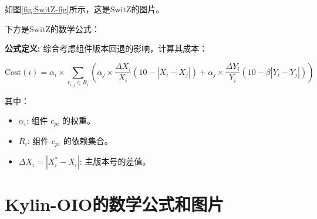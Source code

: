 \documentclass{article}
\begin{document}
如图\ref{fig:SwitZ-fig}所示，这是SwitZ的图片。

下方是SwitZ的数学公式：

\textbf{公式定义:} 综合考虑组件版本回退的影响，计算其成本：

$$
    \text{Cost}(i) = \alpha_i \times \sum_{r_{i,j} \in R_i} \left( \alpha_j \times \frac{\Delta X_i}{X_i} (10 - |X_i - X_j|) + \alpha_j \times \frac{\Delta Y_i}{Y_i} (10 - \beta |Y_i - Y_j|) \right)
$$

其中：

\begin{itemize}
    \item $\alpha_i$: 组件 $c_{pi}$ 的权重。
    \item $R_i$: 组件 $c_{pi}$ 的依赖集合。
    \item $\Delta X_i = |X_i^* - X_i|$: 主版本号的差值。
\end{itemize}

\section{Kylin-OIO的数学公式和图片}
\end{document}
